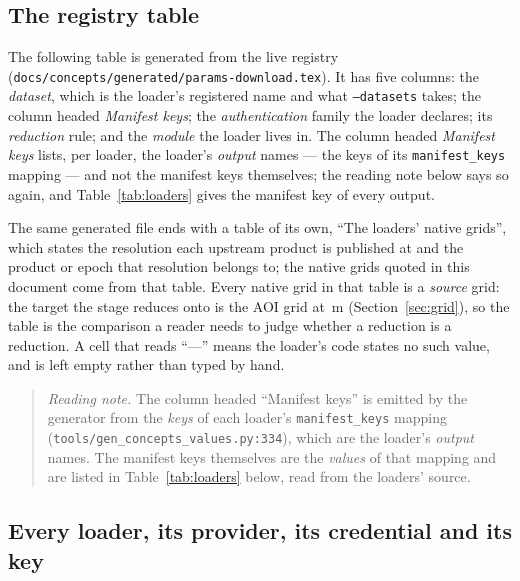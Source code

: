 \documentclass[11pt,a4paper]{article}
\makeatletter
\newcommand{\code}[1]{\texttt{#1}}
\let\origlongtableat\LT@array
\def\LT@array[#1]#2{\origlongtableat[#1]{@{}lllllll@{}}}
\makeatother
\begin{document}
\subsection{The registry table}
\label{sec:registry}

The following table is generated from the live registry
(\code{docs/concepts/generated/params-download.tex}). It has five columns:
the \emph{dataset}, which is the loader's registered name and what
\code{--datasets} takes; the column headed \emph{Manifest keys}; the
\emph{authentication} family the loader declares; its \emph{reduction} rule;
and the \emph{module} the loader lives in. The column headed \emph{Manifest
keys} lists, per loader, the loader's \emph{output} names --- the keys of
its \code{manifest\_keys} mapping --- and not the manifest keys themselves;
the reading note below says so again, and Table~\ref{tab:loaders} gives the
manifest key of every output.

The same generated file ends with a table of its own, ``The loaders' native
grids'', which states the resolution each upstream product is published at
and the product or epoch that resolution belongs to; the native grids quoted
in this document come from that table. Every native grid in that table is a
\emph{source} grid: the target the stage reduces onto is the AOI grid at
\,m (Section~\ref{sec:grid}), so the table
is the comparison a reader needs to judge whether a reduction is a
reduction. A cell that reads ``---'' means the loader's code states no such
value, and is left empty rather than typed by hand.


\makeatletter
\let\LT@array\origlongtableat
\makeatother

\begin{quote}
\small
\emph{Reading note.} The column headed ``Manifest keys'' is emitted by the
generator from the \emph{keys} of each loader's \code{manifest\_keys} mapping
(\code{tools/gen\_concepts\_values.py:334}), which are the loader's
\emph{output} names. The manifest keys themselves are the \emph{values} of
that mapping and are listed in Table~\ref{tab:loaders} below, read from
the loaders' source.
\end{quote}

\subsection{Every loader, its provider, its credential and its key}
\end{document}
